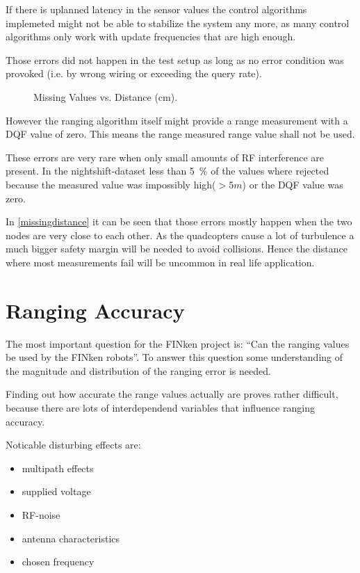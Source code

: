 If there is uplanned latency in the sensor values the control algorithms implemeted might not be able to stabilize the system any more, as many control algorithms only work with update frequencies that are high enough.

Those errors did not happen in the test setup as long as no error condition was provoked (i.e. by wrong wiring or exceeding the query rate).

\begin{figure}[h]
	\centering
	
	\caption[ Missing Values vs. Real Distance ]{ Missing Values vs. Distance (cm).}
	\label{missingdistance}
\end{figure}

However the ranging algorithm itself might provide a range measurement with a DQF value of zero.
This means the range measured range value shall not be used.

These errors are very rare when only small amounts of RF interference are present.
In the nightshift-dataset less than \SI{5}{\percent} of the values where rejected because the measured value was impossibly high($> 5m$) or the DQF value was zero.

In \autoref{missingdistance} it can be seen that those errors mostly happen when the two nodes are very close to each other.
As the quadcopters cause a lot of turbulence a much bigger safety margin will be needed to avoid collisions.
Hence the distance where most measurements fail will be uncommon in real life application.


\section{Ranging Accuracy}

The most important question for the FINken project is: \enquote{Can the ranging values be used by the FINken robots}.
To answer this question some understanding of the magnitude and distribution of the ranging error is needed.

Finding out how accurate the range values actually are proves rather difficult, because there are lots of interdependend variables that influence ranging accuracy.

Noticable disturbing effects are:
\begin{itemize}
	\item multipath effects
	\item supplied voltage
	\item RF-noise
	\item	antenna characteristics
	\item chosen frequency
\end{itemize}

